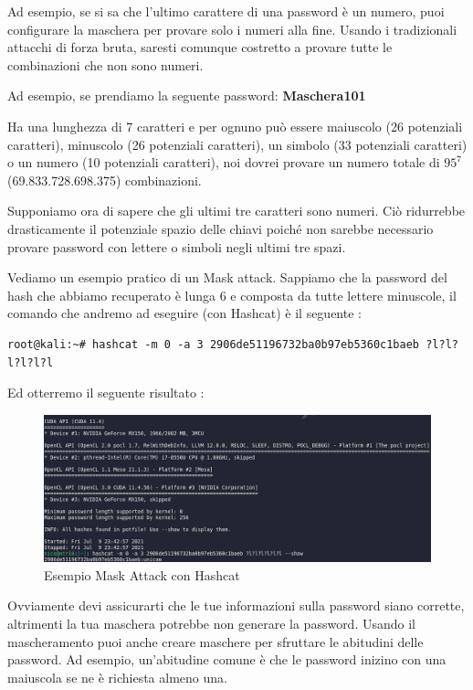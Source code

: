 Ad esempio, se si sa che l'ultimo carattere di una password è un numero, puoi configurare la maschera per provare solo i numeri alla fine. Usando i tradizionali attacchi di forza bruta, saresti comunque costretto a provare tutte le combinazioni che non sono numeri.

Ad esempio, se prendiamo la seguente password: \textbf{Maschera101}

Ha una lunghezza di 7 caratteri e per ognuno può essere maiuscolo (26 potenziali caratteri), minuscolo (26 potenziali caratteri), un simbolo (33 potenziali caratteri) o un numero (10 potenziali caratteri), noi dovrei provare un numero totale di \({95}^{7}\) (69.833.728.698.375) combinazioni.

Supponiamo ora di sapere che gli ultimi tre caratteri sono numeri. Ciò ridurrebbe drasticamente il potenziale spazio delle chiavi poiché non sarebbe necessario provare password con lettere o simboli negli ultimi tre spazi.

Vediamo un esempio pratico di un Mask attack. Sappiamo che la password del hash che abbiamo recuperato è lunga 6 e composta da tutte lettere minuscole, il comando che andremo ad eseguire (con Hashcat) è il seguente :

\begin{lstlisting}[caption={Esempio rule attack wordlist}, style=javaScriptCode]
    root@kali:~# hashcat -m 0 -a 3 2906de51196732ba0b97eb5360c1baeb ?l?l?l?l?l?l
    \end{lstlisting}

Ed otterremo il seguente risultato :

\begin{figure}[h!]
    \centering
    \includegraphics[width=\linewidth]{Immagini/1/mask.png}
    \caption{Esempio Mask Attack con Hashcat}
\end{figure}

Ovviamente devi assicurarti che le tue informazioni sulla password siano corrette, altrimenti la tua maschera potrebbe non generare la password. Usando il mascheramento puoi anche creare maschere per sfruttare le abitudini delle password. Ad esempio, un'abitudine comune è che le password inizino con una maiuscola se ne è richiesta almeno una.

